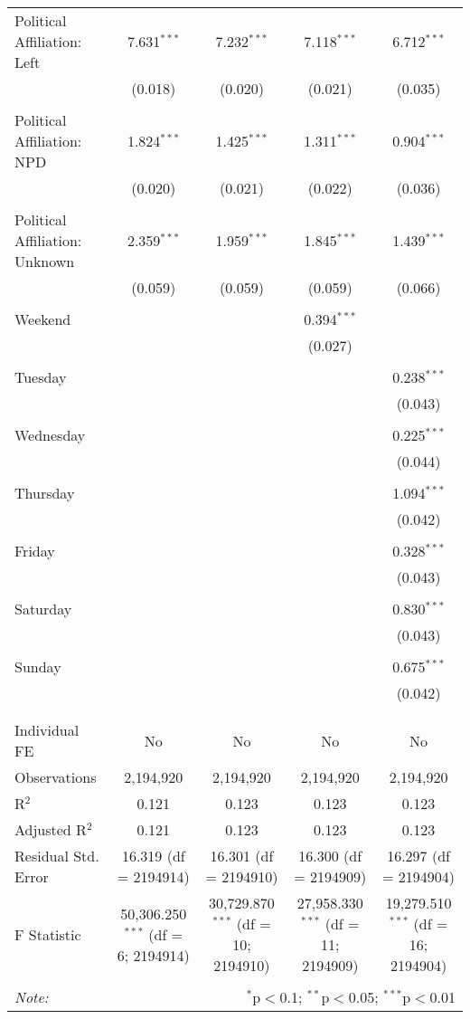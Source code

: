\documentclass[
]{article}
\begin{document}
\begin{table}[!htbp]
{\begin{tabular}{@{\extracolsep{5pt}}lcccc}
 Political Affiliation: Left & 7.631$^{***}$ & 7.232$^{***}$ & 7.118$^{***}$ & 6.712$^{***}$ \\ 
  & (0.018) & (0.020) & (0.021) & (0.035) \\ 
  & & & & \\ 
 Political Affiliation: NPD & 1.824$^{***}$ & 1.425$^{***}$ & 1.311$^{***}$ & 0.904$^{***}$ \\ 
  & (0.020) & (0.021) & (0.022) & (0.036) \\ 
  & & & & \\ 
 Political Affiliation: Unknown & 2.359$^{***}$ & 1.959$^{***}$ & 1.845$^{***}$ & 1.439$^{***}$ \\ 
  & (0.059) & (0.059) & (0.059) & (0.066) \\ 
  & & & & \\ 
 Weekend &  &  & 0.394$^{***}$ &  \\ 
  &  &  & (0.027) &  \\ 
  & & & & \\ 
 Tuesday &  &  &  & 0.238$^{***}$ \\ 
  &  &  &  & (0.043) \\ 
  & & & & \\ 
 Wednesday &  &  &  & 0.225$^{***}$ \\ 
  &  &  &  & (0.044) \\ 
  & & & & \\ 
 Thursday &  &  &  & 1.094$^{***}$ \\ 
  &  &  &  & (0.042) \\ 
  & & & & \\ 
 Friday &  &  &  & 0.328$^{***}$ \\ 
  &  &  &  & (0.043) \\ 
  & & & & \\ 
 Saturday &  &  &  & 0.830$^{***}$ \\ 
  &  &  &  & (0.043) \\ 
  & & & & \\ 
 Sunday &  &  &  & 0.675$^{***}$ \\ 
  &  &  &  & (0.042) \\ 
  & & & & \\ 
\hline \\[-1.8ex] 
Individual FE & No & No & No & No \\ 
Observations & 2,194,920 & 2,194,920 & 2,194,920 & 2,194,920 \\ 
R$^{2}$ & 0.121 & 0.123 & 0.123 & 0.123 \\ 
Adjusted R$^{2}$ & 0.121 & 0.123 & 0.123 & 0.123 \\ 
Residual Std. Error & 16.319 (df = 2194914) & 16.301 (df = 2194910) & 16.300 (df = 2194909) & 16.297 (df = 2194904) \\ 
F Statistic & 50,306.250$^{***}$ (df = 6; 2194914) & 30,729.870$^{***}$ (df = 10; 2194910) & 27,958.330$^{***}$ (df = 11; 2194909) & 19,279.510$^{***}$ (df = 16; 2194904) \\ 
\hline 
\hline \\[-1.8ex] 
\textit{Note:}  & \multicolumn{4}{r}{$^{*}$p$<$0.1; $^{**}$p$<$0.05; $^{***}$p$<$0.01} \\ 
\end{tabular}
} 
\end{table} 
\newpage
\end{document}

